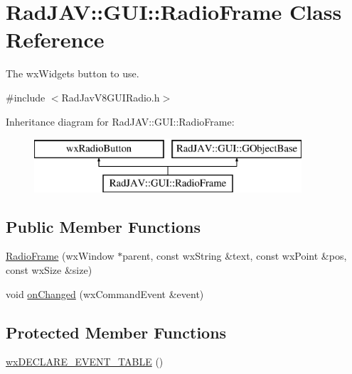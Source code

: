 \hypertarget{class_rad_j_a_v_1_1_g_u_i_1_1_radio_frame}{}\section{Rad\+J\+AV\+:\+:G\+UI\+:\+:Radio\+Frame Class Reference}
\label{class_rad_j_a_v_1_1_g_u_i_1_1_radio_frame}


The wx\+Widgets button to use.  




{\ttfamily \#include $<$Rad\+Jav\+V8\+G\+U\+I\+Radio.\+h$>$}

Inheritance diagram for Rad\+J\+AV\+:\+:G\+UI\+:\+:Radio\+Frame\+:\begin{figure}[H]
\begin{center}
\leavevmode
\includegraphics[height=2.000000cm]{class_rad_j_a_v_1_1_g_u_i_1_1_radio_frame}
\end{center}
\end{figure}
\subsection*{Public Member Functions}
\begin{DoxyCompactItemize}
\item 
\mbox{\hyperlink{class_rad_j_a_v_1_1_g_u_i_1_1_radio_frame_a43207313a8ed5a5cbb3eaec8bb22fb4d}{Radio\+Frame}} (wx\+Window $\ast$parent, const wx\+String \&text, const wx\+Point \&pos, const wx\+Size \&size)
\item 
void \mbox{\hyperlink{class_rad_j_a_v_1_1_g_u_i_1_1_radio_frame_aff4681bb53bebaf89e96f43971b8ef3f}{on\+Changed}} (wx\+Command\+Event \&event)
\end{DoxyCompactItemize}
\subsection*{Protected Member Functions}
\begin{DoxyCompactItemize}
\item 
\mbox{\hyperlink{class_rad_j_a_v_1_1_g_u_i_1_1_radio_frame_a2b6cec7a7a3d46c4b8dd94f946a05413}{wx\+D\+E\+C\+L\+A\+R\+E\+\_\+\+E\+V\+E\+N\+T\+\_\+\+T\+A\+B\+LE}} ()
\end{DoxyCompactItemize}
